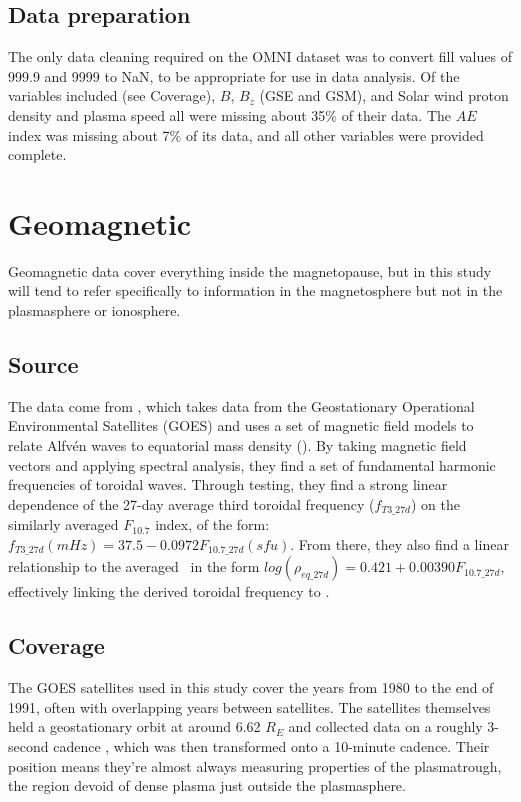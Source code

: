 \subsection{Data preparation}
The only data cleaning required on the OMNI dataset was to convert fill values of 999.9 and 9999 to NaN, to be appropriate for use in data analysis. Of the variables included (see Coverage), $B$, $B_z$ (GSE and GSM), and Solar wind proton density and plasma speed all were missing about 35\% of their data. The $AE$ index was missing about 7\% of its data, and all other variables were provided complete.

\section{Geomagnetic}
Geomagnetic data cover everything inside the magnetopause, but in this study will tend to refer specifically to information in the magnetosphere but not in the plasmasphere or ionosphere.

\subsection{Source}
The data come from \cite{Takahashi2010SolarCycleVariation}, which takes data from the Geostationary Operational Environmental Satellites (GOES) and uses a set of magnetic field models to relate Alfvén waves to equatorial mass density (\req). By taking magnetic field vectors and applying spectral analysis, they find a set of fundamental harmonic frequencies of toroidal waves. Through testing, they find a strong linear dependence of the 27-day average third toroidal frequency ($f_{T3\_27d}$) on the similarly averaged $F_{10.7}$ index, of the form: $f_{T3\_27d}(mHz)=37.5-0.0972 F_{10.7\_27d}(sfu)$. From there, they also find a linear relationship to the averaged \req\ in the form $log(\rho_{eq\_27d})=0.421+0.00390 F_{10.7\_27d}$, effectively linking the derived toroidal frequency to \req.

\subsection{Coverage}
The GOES satellites used in this study cover the years from 1980 to the end of 1991, often with overlapping years between satellites. The satellites themselves held a geostationary orbit at around 6.62 $R_E$ and collected data on a roughly 3-second cadence \citep{GOESDataSource}, which was then transformed onto a 10-minute cadence. Their position means they're almost always measuring properties of the plasmatrough, the region devoid of dense plasma just outside the plasmasphere.

